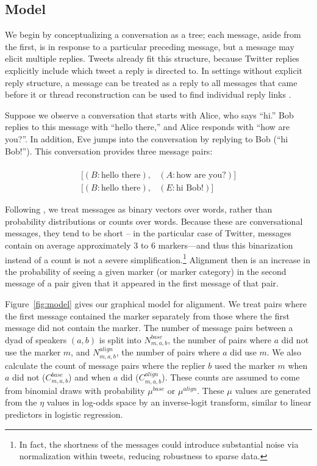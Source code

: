 \documentclass{acm_proc_article-sp}
\begin{document}
\subsection{Model}

We begin by conceptualizing a conversation as a tree; each message, aside from the first, is in response to a particular preceding message, but a message may elicit multiple replies. Tweets already fit this structure, because Twitter replies explicitly include which tweet a reply is directed to.  In settings without explicit reply structure, a message can be treated as a reply to all messages that came before it \cite{WangReitterYen2014} or thread reconstruction can be used to find individual reply links \cite{JonesEtAl2014}.

Suppose we observe a conversation that starts with Alice, who says ``hi.'' Bob replies to this message with ``hello there,'' and Alice responds with ``how are you?''. In addition, Eve jumps into the conversation by replying to Bob (``hi Bob!''). This conversation provides three message pairs:

\begin{align*}
[(A, \textrm{hi}), & (B: \textrm{hello there})] \\
[(B: \textrm{hello there}), & (A: \textrm{how are you?})] \\
[(B: \textrm{hello there}), & (E: \textrm{hi Bob}!)] 
\end{align*}

Following \cite{DNMGamonDumais2011}, we treat messages as binary vectors over words, rather than probability distributions or counts over words.  Because these are conversational messages, they tend to be short -- in the particular case of Twitter, messages contain on average approximately 3 to 6 markers---and thus this binarization instead of a count is not a severe simplification.\footnote{In fact, the shortness of the messages could introduce substantial noise via normalization within tweets, reducing robustness to sparse data.}  Alignment then is an increase in the probability of seeing a given marker (or marker category) in the second message of a pair given that it appeared in the first message of that pair.

Figure~\ref{fig:model} gives our graphical model for alignment. We treat pairs where the first message contained the marker separately from those where the first message did not contain the marker.  The number of message pairs between a dyad of speakers $(a,b)$ is split into $N^{base}_{m,a,b}$, the number of pairs where $a$ did not use the marker $m$, and $N^{align}_{m,a,b}$, the number of pairs where $a$ did use $m$.  We also calculate the count of message pairs where the replier $b$ used the marker $m$ when $a$ did not ($C^{base}_{m,a,b}$) and when $a$ did ($C^{align}_{m,a,b}$).   These counts are assumed to come from binomial draws with probability $\mu^{base}$ or $\mu^{align}$.  These $\mu$ values are generated from the $\eta$ values in log-odds space by an inverse-logit transform, similar to linear predictors in logistic regression.
\end{document}
